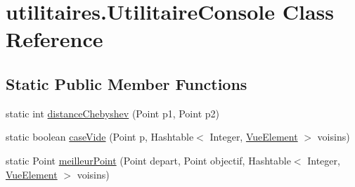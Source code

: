 \hypertarget{classutilitaires_1_1_utilitaire_console}{\section{utilitaires.\-Utilitaire\-Console Class Reference}
\label{classutilitaires_1_1_utilitaire_console}
}
\subsection*{Static Public Member Functions}
\begin{DoxyCompactItemize}
\item 
static int \hyperlink{classutilitaires_1_1_utilitaire_console_a8f1e1132caa9d8c8053928059a4d135f}{distance\-Chebyshev} (Point p1, Point p2)
\item 
static boolean \hyperlink{classutilitaires_1_1_utilitaire_console_a0a8a70d43c8e2b088c61bd54426aa54e}{case\-Vide} (Point p, Hashtable$<$ Integer, \hyperlink{classinterface_graphique_1_1_vue_element}{Vue\-Element} $>$ voisins)
\item 
static Point \hyperlink{classutilitaires_1_1_utilitaire_console_a908f412de528ec70fd53ae469b854937}{meilleur\-Point} (Point depart, Point objectif, Hashtable$<$ Integer, \hyperlink{classinterface_graphique_1_1_vue_element}{Vue\-Element} $>$ voisins)
\end{DoxyCompactItemize}


